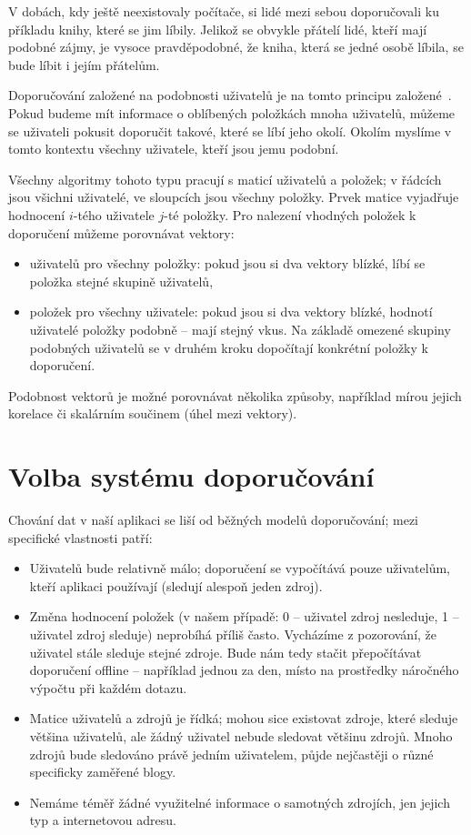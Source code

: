 V dobách, kdy ještě neexistovaly počítače, si lidé mezi sebou doporučovali ku příkladu knihy, které se jim líbily.
Jelikož se obvykle přátelí lidé, kteří mají podobné zájmy, je vysoce pravděpodobné, že kniha, která se jedné osobě líbila, se bude líbit i jejím přátelům.

Doporučování založené na podobnosti uživatelů je na tomto principu založené~\cite{schafer2007collaborative}.
Pokud budeme mít informace o oblíbených položkách mnoha uživatelů, můžeme se uživateli pokusit doporučit takové, které se líbí jeho okolí.
Okolím myslíme v tomto kontextu všechny uživatele, kteří jsou jemu podobní.

Všechny algoritmy tohoto typu pracují s maticí uživatelů a položek; v řádcích jsou všichni uživatelé, ve sloupcích jsou všechny položky.
Prvek matice vyjadřuje hodnocení $i$-tého uživatele $j$-té položky.
Pro nalezení vhodných položek k doporučení můžeme porovnávat vektory:
\begin{itemize}
    \item uživatelů pro všechny položky: pokud jsou si dva vektory blízké, líbí se položka stejné skupině uživatelů,
    \item položek pro všechny uživatele: pokud jsou si dva vektory blízké, hodnotí uživatelé položky podobně -- mají stejný vkus.
        Na základě omezené skupiny podobných uživatelů se v druhém kroku dopočítají konkrétní položky k doporučení.
\end{itemize}

Podobnost vektorů je možné porovnávat několika způsoby, například mírou jejich korelace či skalárním součinem (úhel mezi vektory).

\section{Volba systému doporučování}\label{sec:volba-systemu-doporucovani}

Chování dat v naší aplikaci se liší od běžných modelů doporučování; mezi specifické vlastnosti patří:

\begin{itemize}
    \item Uživatelů bude relativně málo; doporučení se vypočítává pouze uživatelům, kteří aplikaci používají (sledují alespoň jeden zdroj).
    \item Změna hodnocení položek (v našem případě: 0 -- uživatel zdroj nesleduje, 1 -- uživatel zdroj sleduje) neprobíhá příliš často.
        Vycházíme z pozorování, že uživatel stále sleduje stejné zdroje.
        Bude nám tedy stačit přepočítávat doporučení offline -- například jednou za den, místo na prostředky náročného výpočtu při každém dotazu.
    \item Matice uživatelů a zdrojů je řídká; mohou sice existovat zdroje, které sleduje většina uživatelů, ale žádný uživatel nebude sledovat většinu zdrojů.
        Mnoho zdrojů bude sledováno právě jedním uživatelem, půjde nejčastěji o různé specificky zaměřené blogy.
    \item Nemáme téměř žádné využitelné informace o samotných zdrojích, jen jejich typ a internetovou adresu.
\end{itemize}

